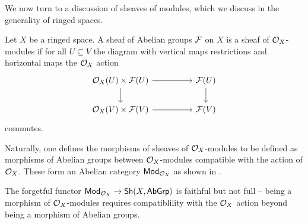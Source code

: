 We now turn to a discussion of sheaves of modules, which we discuss in the generality of ringed spaces. 
\begin{definition}\label{def: OX modules}
    Let $X$ be a ringed space. A sheaf of Abelian groups $\mathcal{F}$ on $X$ is a sheaf of $\mathcal{O}_{X}$-modules if for all $U\subseteq V$ the diagram with vertical maps restrictions and horizontal maps the $\mathcal{O}_{X}$ action
    $$%
    \begin{tikzcd}
        {\Ocal_{X}(U)\times\Fcal(U)} && {\Fcal(U)} \\
        {\Ocal_{X}(V)\times\Fcal(V)} && {\Fcal(V)}
        \arrow[from=1-1, to=1-3]
        \arrow[from=1-1, to=2-1]
        \arrow[from=1-3, to=2-3]
        \arrow[from=2-1, to=2-3]
    \end{tikzcd}$$
    commutes. 
\end{definition}
Naturally, one defines the morphisms of sheaves of $\mathcal{O}_{X}$-modules to be defined as morphisms of Abelian groups between $\mathcal{O}_{X}$-modules compatible with the action of $\mathcal{O}_{X}$. These form an Abelian category $\mathsf{Mod}_{\mathcal{O}_{X}}$ as shown in \cite[\href{https://stacks.math.columbia.edu/tag/01AF}{Tag 01AF}]{stacks-project}. 
\begin{remark}
    The forgetful functor $\mathsf{Mod}_{\mathcal{O}_{X}}\to\mathsf{Sh}(X,\mathsf{AbGrp})$ is faithful but not full -- being a morphism of $\mathcal{O}_{X}$-modules requires compatiblility with the $\mathcal{O}_{X}$ action beyond being a morphism of Abelian groups. 
\end{remark}
